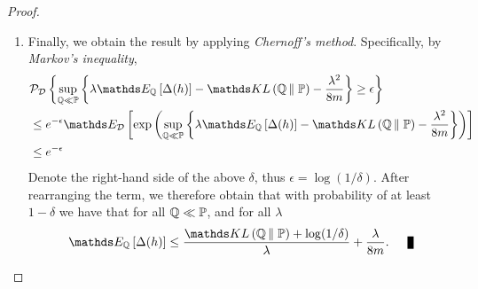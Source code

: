 \documentclass[11pt]{article}
\begin{document}
\begin{itemize}
\begin{proof}
\begin{enumerate}
\item  Finally, we  obtain the result by applying \emph{Chernoff's method}. Specifically, by \emph{Markov's inequality}, 
\begin{align}
&\cP_{\cD}\set{\sup_{\bQ \ll \bP}\set{\lambda  \E{\bQ}{\Delta(h)}  - \kl{\bQ}{\bP} - \frac{\lambda^2 }{8m}  } \ge \epsilon} \nonumber\\
&\le e^{-\epsilon}\E{\cD}{\exp\paren{\sup_{\bQ \ll \bP}\set{\lambda\E{\bQ}{\Delta(h)} - \kl{\bQ}{\bP} - \frac{\lambda^2 }{8m}  }}} \nonumber\\
&\le e^{-\epsilon}  \label{pf: catoni_pac_bayes_kl_6}
\end{align} Denote the right-hand side of the above $\delta$, thus $\epsilon = \log(1/\delta)$. After rearranging the term, we therefore obtain that with probability of at least $1 - \delta$ we have that for all ${\mathbb Q} \ll {\mathbb P}$, and for all $\lambda$
\begin{align*}
 \E{\bQ}{\Delta(h)} \le \frac{\kl{\bQ}{\bP}  + \log(1/\delta) }{\lambda} +  \frac{\lambda }{8m}. \qed
\end{align*} 
\end{enumerate}
\end{proof}


\end{itemize}
\end{document}
